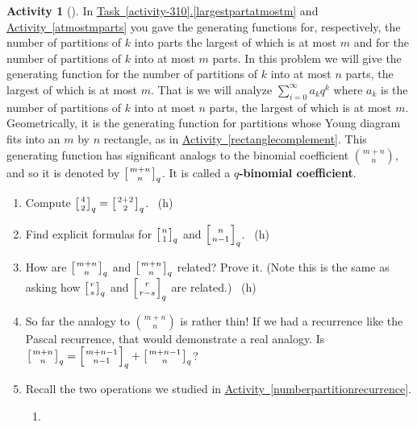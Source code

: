 \documentclass[10pt,]{book}
\newcommand{\terminology}[1]{\textbf{#1}}
\theoremstyle{plain}
\theoremstyle{definition}
\theoremstyle{definition}
\theoremstyle{definition}
\newtheorem{activity}[project]{Activity}
\numberwithin{equation}{chapter}
\newcommand{\qchoose}[2]{\left[{#1\atop#2}\right]_q}
\begin{document}
\begin{activity}[]\label{qtorialformula}
\hypertarget{p-1613}{}%
In \hyperref[largestpartatmostm]{Task~\ref{activity-310}.\ref{largestpartatmostm}} and \hyperref[atmostmparts]{Activity~\ref{atmostmparts}} you gave the generating functions for, respectively, the number of partitions of \(k\) into parts the largest of which is at most \(m\) and for the number of partitions of \(k\) into at most \(m\) parts. In this problem we will give the generating function for the number of partitions of \(k\) into at most \(n\) parts, the largest of which is at most \(m\). That is we will analyze \(\sum_{i=0}^\infty a_kq^k\) where \(a_k\) is the number of partitions of \(k\) into at most \(n\) parts, the largest of which is at most \(m\). Geometrically, it is the generating function for partitions whose Young diagram fits into an \(m\) by \(n\) rectangle, as in \hyperref[rectanglecomplement]{Activity~\ref{rectanglecomplement}}. This generating function has significant analogs to the binomial coefficient \(\binom{m+n}{n}\), and so it is denoted by \(\qchoose{m+n}{n}\). It is called a \terminology{\(q\)-binomial coefficient}.%
\begin{enumerate}[font=\bfseries,label=(\alph*),ref=\alph*]
\item\label{task-279} \hypertarget{p-1614}{}%
Compute \(\qchoose{4}{2}=\qchoose{2+2}{2}\).%
~{\tiny (h)}\item\label{task-280} \hypertarget{p-1617}{}%
Find explicit formulas for \(\qchoose{n}{1}\) and \(\qchoose{n}{n-1}\).%
~{\tiny (h)}\item\label{task-281} \hypertarget{p-1620}{}%
How are \(\qchoose{m+n}{n}\) and \(\qchoose{m+n}{n}\) related? Prove it. (Note this is the same as asking how \(\qchoose{r}{s}\) and \(\qchoose{r}{r-s}\) are related.)%
~{\tiny (h)}\item\label{task-282} \hypertarget{p-1623}{}%
So far the analogy to \(\binom{m+n}{n}\) is rather thin! If we had a recurrence like the Pascal recurrence, that would demonstrate a real analogy. Is \(\qchoose{m+n}{n}= \qchoose{m+n-1}{n-1}+\qchoose{m+n-1}{n}\)?%
\item\label{task-283} \hypertarget{p-1625}{}%
Recall the two operations we studied in \hyperref[numberpartitionrecurrence]{Activity~\ref{numberpartitionrecurrence}}.%
\begin{enumerate}[font=\bfseries,label=(\roman*),ref=\theenumi.\roman*]
\item\label{task-284} \hypertarget{p-1626}{}%

\end{enumerate}
\end{enumerate}
\end{activity}
\end{document}
